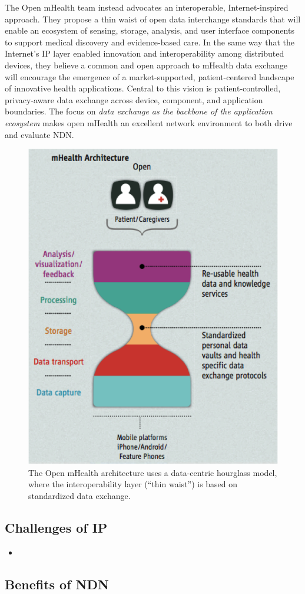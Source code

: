The Open mHealth team instead advocates an interoperable,  Internet-inspired
approach. They propose a thin waist of open data interchange standards
that will enable an ecosystem of sensing, storage, analysis, and user
interface components to support medical
discovery and evidence-based care.  In the same way that the Internet's
IP layer enabled innovation and interoperability among distributed
devices, they believe a common and open approach to mHealth data exchange
will  encourage the emergence of a market-supported, patient-centered
landscape of innovative health applications. Central to this vision is
patient-controlled, privacy-aware data exchange across device, component,
and application boundaries.  The focus on \emph{data exchange as the
backbone of the application ecosystem} makes open mHealth an excellent
network environment to both drive and evaluate NDN.

\begin{figure}
\begin{center}
\includegraphics[width=.4\textwidth]{figures/mHealth-hourglass}
\caption{The Open mHealth architecture uses a data-centric hourglass model, where the interoperability layer (``thin waist'') is based on standardized data exchange.~\cite{SimEstrin2010}}
\label{fig:mHealth}
\end{center}
\end{figure}

\subsection{Challenges of IP}

\begin{itemize}
 \item
\end{itemize}

\subsection{Benefits of NDN}

